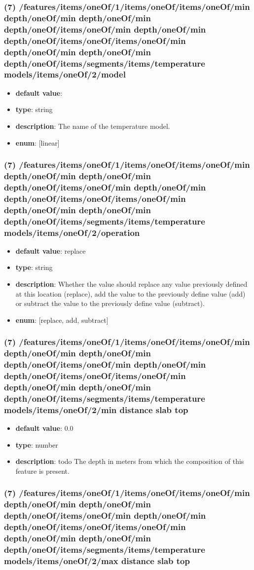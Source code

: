 \subsubsection{(7) /features/items/oneOf/1/items/oneOf/items/oneOf/min depth/oneOf/min depth/oneOf/min depth/oneOf/items/oneOf/min depth/oneOf/min depth/oneOf/items/oneOf/items/oneOf/min depth/oneOf/min depth/oneOf/min depth/oneOf/items/segments/items/temperature models/items/oneOf/2/model}
\begin{itemize}[leftmargin=7em]\item {\bf default value}: 
\item {\bf type}: string
\item {\bf description}: The name of the temperature model.
\item {\bf enum}: [linear]\end{itemize}\subsubsection{(7) /features/items/oneOf/1/items/oneOf/items/oneOf/min depth/oneOf/min depth/oneOf/min depth/oneOf/items/oneOf/min depth/oneOf/min depth/oneOf/items/oneOf/items/oneOf/min depth/oneOf/min depth/oneOf/min depth/oneOf/items/segments/items/temperature models/items/oneOf/2/operation}
\begin{itemize}[leftmargin=7em]\item {\bf default value}: replace
\item {\bf type}: string
\item {\bf description}: Whether the value should replace any value previously defined at this location (replace), add the value to the previously define value (add) or subtract the value to the previously define value (subtract).
\item {\bf enum}: [replace, add, subtract]\end{itemize}\subsubsection{(7) /features/items/oneOf/1/items/oneOf/items/oneOf/min depth/oneOf/min depth/oneOf/min depth/oneOf/items/oneOf/min depth/oneOf/min depth/oneOf/items/oneOf/items/oneOf/min depth/oneOf/min depth/oneOf/min depth/oneOf/items/segments/items/temperature models/items/oneOf/2/min distance slab top}
\begin{itemize}[leftmargin=7em]\item {\bf default value}: 0.0
\item {\bf type}: number
\item {\bf description}: todo The depth in meters from which the composition of this feature is present.
\end{itemize}\subsubsection{(7) /features/items/oneOf/1/items/oneOf/items/oneOf/min depth/oneOf/min depth/oneOf/min depth/oneOf/items/oneOf/min depth/oneOf/min depth/oneOf/items/oneOf/items/oneOf/min depth/oneOf/min depth/oneOf/min depth/oneOf/items/segments/items/temperature models/items/oneOf/2/max distance slab top}
